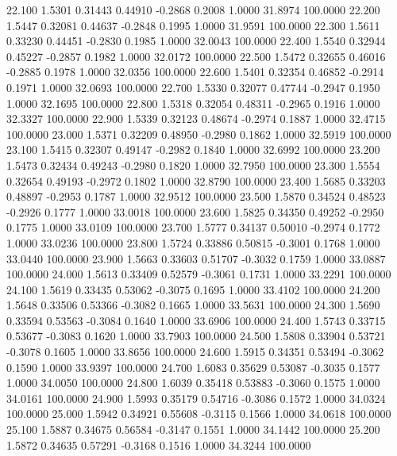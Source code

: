  22.100   1.5301   0.31443   0.44910  -0.2868   0.2008   1.0000  31.8974 100.0000
  22.200   1.5447   0.32081   0.44637  -0.2848   0.1995   1.0000  31.9591 100.0000
  22.300   1.5611   0.33230   0.44451  -0.2830   0.1985   1.0000  32.0043 100.0000
  22.400   1.5540   0.32944   0.45227  -0.2857   0.1982   1.0000  32.0172 100.0000
  22.500   1.5472   0.32655   0.46016  -0.2885   0.1978   1.0000  32.0356 100.0000
  22.600   1.5401   0.32354   0.46852  -0.2914   0.1971   1.0000  32.0693 100.0000
  22.700   1.5330   0.32077   0.47744  -0.2947   0.1950   1.0000  32.1695 100.0000
  22.800   1.5318   0.32054   0.48311  -0.2965   0.1916   1.0000  32.3327 100.0000
  22.900   1.5339   0.32123   0.48674  -0.2974   0.1887   1.0000  32.4715 100.0000
  23.000   1.5371   0.32209   0.48950  -0.2980   0.1862   1.0000  32.5919 100.0000
  23.100   1.5415   0.32307   0.49147  -0.2982   0.1840   1.0000  32.6992 100.0000
  23.200   1.5473   0.32434   0.49243  -0.2980   0.1820   1.0000  32.7950 100.0000
  23.300   1.5554   0.32654   0.49193  -0.2972   0.1802   1.0000  32.8790 100.0000
  23.400   1.5685   0.33203   0.48897  -0.2953   0.1787   1.0000  32.9512 100.0000
  23.500   1.5870   0.34524   0.48523  -0.2926   0.1777   1.0000  33.0018 100.0000
  23.600   1.5825   0.34350   0.49252  -0.2950   0.1775   1.0000  33.0109 100.0000
  23.700   1.5777   0.34137   0.50010  -0.2974   0.1772   1.0000  33.0236 100.0000
  23.800   1.5724   0.33886   0.50815  -0.3001   0.1768   1.0000  33.0440 100.0000
  23.900   1.5663   0.33603   0.51707  -0.3032   0.1759   1.0000  33.0887 100.0000
  24.000   1.5613   0.33409   0.52579  -0.3061   0.1731   1.0000  33.2291 100.0000
  24.100   1.5619   0.33435   0.53062  -0.3075   0.1695   1.0000  33.4102 100.0000
  24.200   1.5648   0.33506   0.53366  -0.3082   0.1665   1.0000  33.5631 100.0000
  24.300   1.5690   0.33594   0.53563  -0.3084   0.1640   1.0000  33.6906 100.0000
  24.400   1.5743   0.33715   0.53677  -0.3083   0.1620   1.0000  33.7903 100.0000
  24.500   1.5808   0.33904   0.53721  -0.3078   0.1605   1.0000  33.8656 100.0000
  24.600   1.5915   0.34351   0.53494  -0.3062   0.1590   1.0000  33.9397 100.0000
  24.700   1.6083   0.35629   0.53087  -0.3035   0.1577   1.0000  34.0050 100.0000
  24.800   1.6039   0.35418   0.53883  -0.3060   0.1575   1.0000  34.0161 100.0000
  24.900   1.5993   0.35179   0.54716  -0.3086   0.1572   1.0000  34.0324 100.0000
  25.000   1.5942   0.34921   0.55608  -0.3115   0.1566   1.0000  34.0618 100.0000
  25.100   1.5887   0.34675   0.56584  -0.3147   0.1551   1.0000  34.1442 100.0000
  25.200   1.5872   0.34635   0.57291  -0.3168   0.1516   1.0000  34.3244 100.0000
